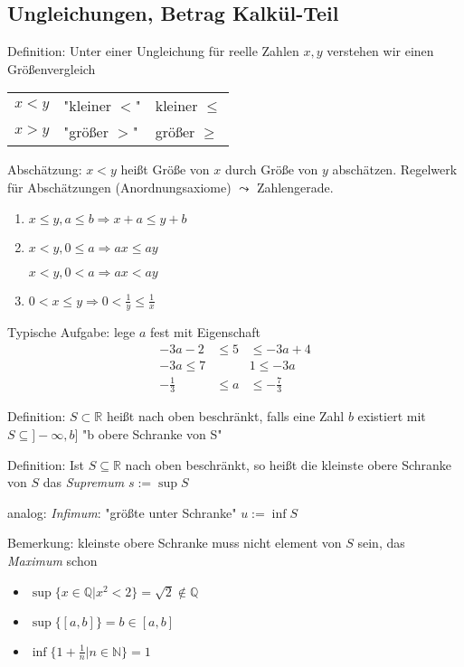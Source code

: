 
\subsection{Ungleichungen,  Betrag Kalkül-Teil}
Definition: Unter einer Ungleichung für reelle Zahlen $x,y$ verstehen wir einen Größenvergleich
\begin{center}
\begin{tabular}{lll}
$x<y$ & "kleiner $<$" & kleiner $\leq$ \\ 
$x>y$ & "größer $>$" & größer $\geq$
\end{tabular}
\end{center}

Abschätzung: $x<y$ heißt Größe von $x$ durch Größe von $y$ abschätzen. Regelwerk für Abschätzungen (Anordnungsaxiome)
$\leadsto$ Zahlengerade.
\begin{enumerate}
 \item $x \leq y, a\leq b \Rightarrow x+a \leq y+b$
 \item $x<y, 0 \leq a \Rightarrow ax \leq ay$
 
$x<y, 0 < a \Rightarrow ax < ay$
 \item $0<x\leq y \Rightarrow 0 < \frac{1}{y} \leq \frac{1}{x}$
\end{enumerate}
Typische Aufgabe:
lege $a$ fest mit Eigenschaft
\begin{align*}
-3a-2 &\leq 5 &\leq -3a+4 \\
-3a\leq 7 & & 1 \leq -3a \\
-\frac{1}{3} &\leq a &\leq -\frac{7}{3}
\end{align*}

Definition: $S \subset \mathbb{R}$ heißt nach oben beschränkt, falls eine Zahl $b$ existiert mit $S\subseteq ]-\infty,b]$ "b obere Schranke von S"

Definition: Ist $S \subseteq \mathbb{R}$ nach oben beschränkt, so heißt die kleinste obere Schranke von $S$ das \emph{Supremum} $s:=\sup S$

analog: \emph{Infimum}: "größte unter Schranke" $u := \inf S$

Bemerkung: kleinste obere Schranke muss nicht element von $S$ sein, das \emph{Maximum} schon

\begin{itemize}
 \item $\sup \{x \in \mathbb{Q} | x^2 < 2 \} = \sqrt{2} \notin \mathbb{Q}$
 \item $\sup \{[a,b]\} = b \in [a,b]$
 \item $\inf \{ 1+\frac{1}{n}|n\in \mathbb{N}\} = 1$
\end{itemize}

